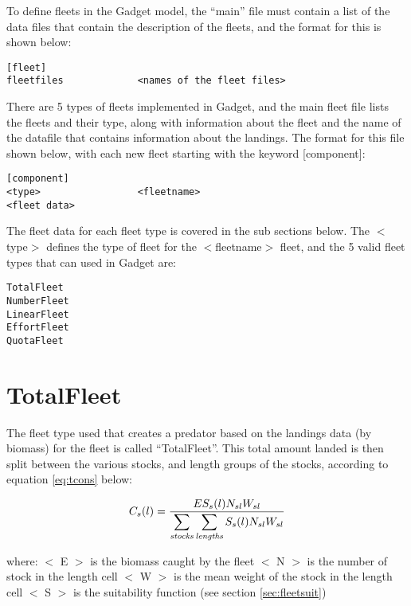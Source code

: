 \documentclass[]{book}
\begin{document}
To define fleets in the Gadget model, the ``main'' file must contain a
list of the data files that contain the description of the fleets, and
the format for this is shown below:

\begin{verbatim}
[fleet]
fleetfiles             <names of the fleet files>
\end{verbatim}

There are 5 types of fleets implemented in Gadget, and the main fleet
file lists the fleets and their type, along with information about the
fleet and the name of the datafile that contains information about the
landings. The format for this file shown below, with each new fleet
starting with the keyword {[}component{]}:

\begin{verbatim}
[component]
<type>                 <fleetname>
<fleet data>
\end{verbatim}

The fleet data for each fleet type is covered in the sub sections below.
The \(<\)type\(>\) defines the type of fleet for the \(<\)fleetname\(>\) fleet,
and the 5 valid fleet types that can used in Gadget are:

\begin{verbatim}
TotalFleet 
NumberFleet 
LinearFleet 
EffortFleet 
QuotaFleet
\end{verbatim}

\hypertarget{sec:totalfleet}{%
\section{TotalFleet}\label{sec:totalfleet}}

The fleet type used that creates a predator based on the landings data
(by biomass) for the fleet is called ``TotalFleet''. This total amount
landed is then split between the various stocks, and length groups of
the stocks, according to
equation \eqref{eq:tcons} below:

\begin{equation}
\label{eq:tcons}
C_{s}(l) = \frac{E S_{s}(l) N_{sl} W_{sl}}{\displaystyle \sum_{\it stocks} \sum_{\it lengths} S_{s}(l) N_{sl} W_{sl}}\end{equation}

where: \(<\) E \(>\) is the biomass caught by the fleet \(<\) N \(>\) is the
number of stock in the length cell \(<\) W \(>\) is the mean weight of the
stock in the length cell \(<\) S \(>\) is the suitability function (see
section \ref{sec:fleetsuit})
\end{document}
